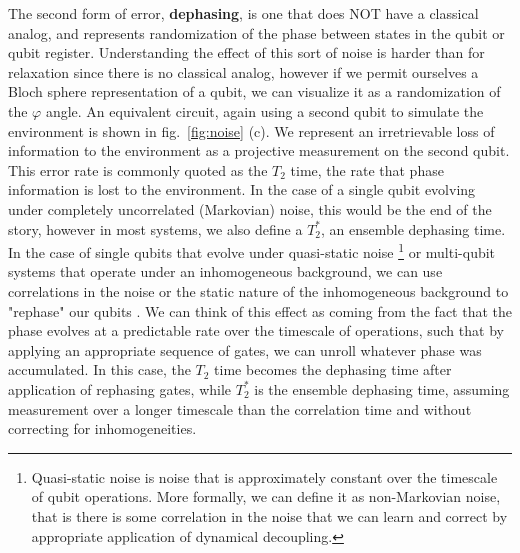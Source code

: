 The second form of error, \textbf{dephasing}, is one that does NOT have a classical analog, and represents randomization of the phase between
states in the qubit or qubit register. Understanding the effect of this sort of noise is harder than for relaxation since there is no
classical analog, however if we permit ourselves a Bloch sphere representation of a qubit, we can visualize it
as a randomization of the $\varphi$ angle. An equivalent circuit, again using a second qubit to simulate the
environment is shown in fig.~\ref{fig:noise} (c). We represent an irretrievable loss of information to the
environment as a projective measurement on the second qubit. This error rate is commonly quoted as the $T_2$ time,
the rate that phase information is lost to the environment. In the case of a single qubit evolving under completely uncorrelated
(Markovian) noise, this would be the end of the story, however in most systems, we also define a $T_2^*$, an ensemble
dephasing time. In the case of single qubits that evolve under quasi-static noise
\footnote{Quasi-static noise is noise that is approximately constant over the timescale of qubit operations. More formally,
we can define it as non-Markovian noise, that is there is some correlation in the noise that we can learn and correct
by appropriate application of dynamical decoupling.} or multi-qubit systems that operate
under an inhomogeneous background, we can use correlations in the noise or the static nature of the inhomogeneous background
to "rephase" our qubits \cite{PhysRev.80.580,dynamic-decoupling-biercuk}. We can think of this effect as coming from the
fact that the phase evolves at a predictable rate over the timescale of operations, such that by applying an appropriate sequence
of gates, we can unroll whatever phase was accumulated.  In this case, the $T_2$ time becomes the dephasing time after
application of rephasing gates, while $T_2^*$ is the ensemble dephasing time, assuming measurement over a longer timescale
than the correlation time and without correcting for inhomogeneities.

